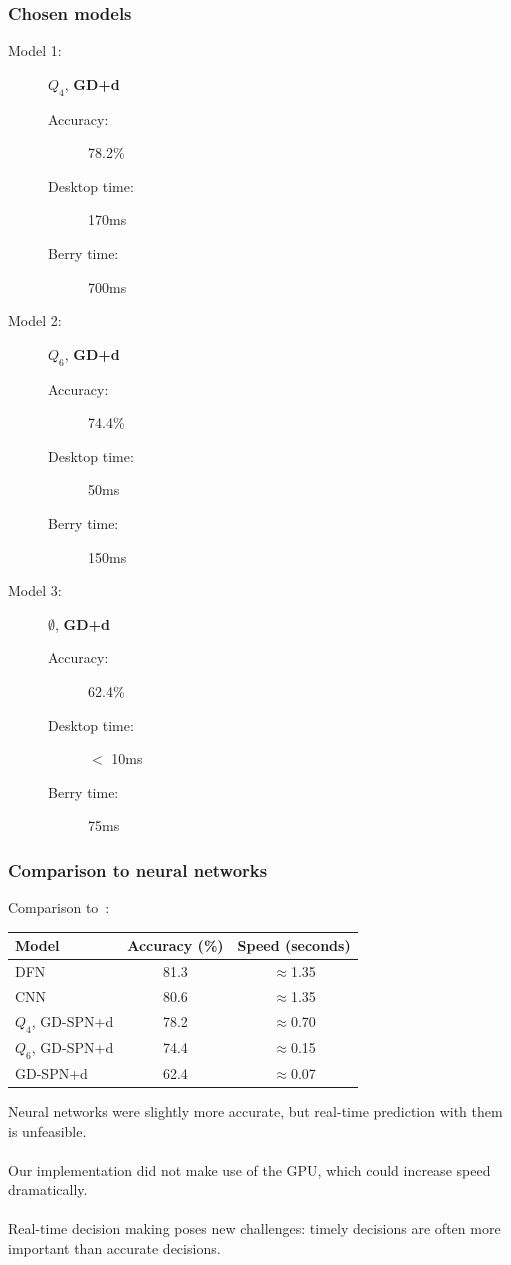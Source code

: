 \documentclass{beamer}
\begin{document}
\begin{frame}
  \frametitle{Chosen models}

  \begin{description}
    \item[Model 1:] $Q_4$, \textbf{GD+d}
      \begin{description}
        \item[Accuracy:] 78.2\%
        \item[Desktop time:] 170ms
        \item[Berry time:] 700ms
      \end{description}
    \item[Model 2:] $Q_6$, \textbf{GD+d}
      \begin{description}
        \item[Accuracy:] 74.4\%
        \item[Desktop time:] 50ms
        \item[Berry time:] 150ms
      \end{description}
    \item[Model 3:] $\emptyset$, \textbf{GD+d}
      \begin{description}
        \item[Accuracy:] 62.4\%
        \item[Desktop time:] $<$ 10ms
        \item[Berry time:] 75ms
      \end{description}
  \end{description}
\end{frame}

\begin{frame}
  \frametitle{Comparison to neural networks}

  Comparison to~\cite{moraes18}:

  \begin{table}
    \centering
    \begin{tabular}{l|c|c}
      \textbf{Model} & \textbf{Accuracy (\%)} & \textbf{Speed (seconds)}\\
      \hline
      DFN & 81.3 & $\approx$1.35\\
      CNN & 80.6 & $\approx$1.35\\
      \hline
      $Q_4$, GD-SPN+d & 78.2 & $\approx$0.70\\
      $Q_6$, GD-SPN+d & 74.4 & $\approx$0.15\\
      GD-SPN+d & 62.4 & $\approx$0.07
    \end{tabular}
  \end{table}

  Neural networks were slightly more accurate, but real-time prediction with them is
  unfeasible.\\~\\

  Our implementation did not make use of the GPU, which could increase speed dramatically.\\~\\

  Real-time decision making poses new challenges: timely decisions are often more important than
  accurate decisions.

\end{frame}
\end{document}
